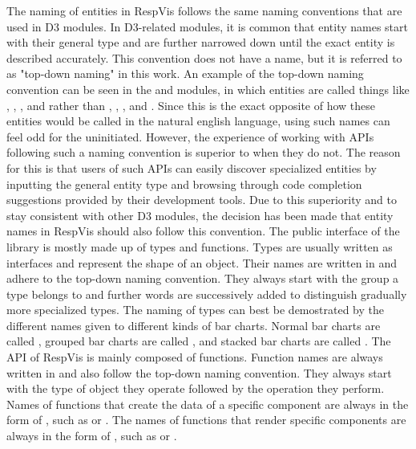 The naming of entities in RespVis follows the same naming conventions that are used in D3 modules.
In D3-related modules, it is common that entity names start with their general type and are further narrowed down until the exact entity is described accurately.
This convention does not have a name, but it is referred to as "top-down naming" in this work.
An example of the top-down naming convention can be seen in the  \parencite{D3Scale} and  \parencite{D3Axis} modules, in which entities are called things like , , , and  rather than , , , and .
Since this is the exact opposite of how these entities would be called in the natural english language, using such names can feel odd for the uninitiated. 
However, the experience of working with APIs following such a naming convention is superior to when they do not.
The reason for this is that users of such APIs can easily discover specialized entities by inputting the general entity type and browsing through code completion suggestions provided by their development tools.
Due to this superiority and to stay consistent with other D3 modules, the decision has been made that entity names in RespVis should also follow this convention.
The public interface of the library is mostly made up of types and functions.
Types are usually written as interfaces and represent the shape of an object. 
Their names are written in  and adhere to the top-down naming convention.
They always start with the group a type belongs to and further words are successively added to distinguish gradually more specialized types.
The naming of types can best be demostrated by the different names given to different kinds of bar charts.
Normal bar charts are called , grouped bar charts are called , and stacked bar charts are called .
The API of RespVis is mainly composed of functions.
Function names are always written in  and also follow the top-down naming convention.
They always start with the type of object they operate followed by the operation they perform.
Names of functions that create the data of a specific component are always in the form of , such as  or .
The names of functions that render specific components are always in the form of , such as  or . 


